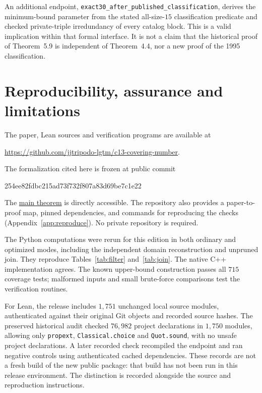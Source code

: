 \documentclass[11pt]{article}
\theoremstyle{definition}
\theoremstyle{remark}
\begin{document}
An additional endpoint,
\texttt{exact30\_after\_published\_classification}, derives the
minimum-bound parameter from the stated all-size-$15$
classification predicate and checked private-triple irredundancy
of every catalog block. This is a valid implication within that
formal interface. It is not a claim that the historical proof of
Theorem~5.9 is independent of Theorem~4.4, nor a new proof of the
1995 classification.

\section{Reproducibility, assurance and limitations}\label{sec:release}
The paper, Lean sources and verification programs are available at
\begin{center}\small
\url{https://github.com/jjtripodo-lgtm/c13-covering-number}.
\end{center}
The formalization cited here is frozen at public commit
\begin{center}\small\ttfamily
254ee82fdbc215ad73f732f807a83d69be7c1e22
\end{center}
The
\href{https://github.com/jjtripodo-lgtm/c13-covering-number/blob/254ee82fdbc215ad73f732f807a83d69be7c1e22/lean/C13Global/Final.lean}{main theorem}
is directly accessible. The repository also provides a paper-to-proof map,
pinned dependencies, and commands for reproducing the checks
(Appendix~\ref{app:reproduce}). No private repository is required.

The Python computations were rerun for this edition in both ordinary and
optimized modes, including the independent domain reconstruction and
unpruned join. They reproduce Tables~\ref{tab:filter} and~\ref{tab:join}.
The native C++ implementation agrees. The known upper-bound construction
passes all $715$ coverage tests; malformed inputs and small brute-force
comparisons test the verification routines.

For Lean, the release includes $1{,}751$ unchanged local source modules,
authenticated against their original Git objects and recorded source
hashes. The preserved historical audit checked $76{,}982$ project
declarations in $1{,}750$ modules, allowing only \texttt{propext},
\texttt{Classical.choice} and \texttt{Quot.sound}, with no unsafe project
declarations. A later recorded check recompiled the endpoint and ran
negative controls using authenticated cached dependencies. These records
are not a fresh build of the new public package: that build has not been
run in this release environment. The distinction is recorded alongside
the source and reproduction instructions.
\end{document}
